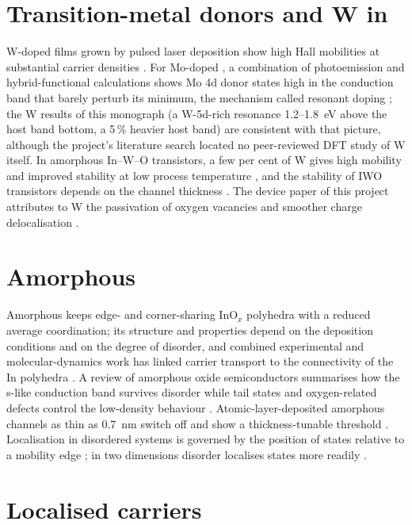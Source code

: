 \section{Transition-metal donors and W in \texorpdfstring{\InO}{In2O3}}
\label{sec:mono-lit-w}

W-doped \InO{} films grown by pulsed laser deposition show high Hall mobilities at substantial carrier densities
\citep{Newhouse2005}. For Mo-doped \InO{}, a combination of photoemission and hybrid-functional calculations shows Mo 4d
donor states high in the conduction band that barely perturb its minimum, the mechanism called resonant doping
\citep{Swallow2020}; the W results of this monograph (a W-5d-rich resonance 1.2--1.8~eV above the host band bottom, a
5\,\% heavier host band) are consistent with that picture, although the project's literature search located no
peer-reviewed DFT study of W itself. In amorphous In--W--O transistors, a few per cent of W gives high mobility and
improved stability at low process temperature \citep{Kizu2014}, and the stability of IWO transistors depends on the
channel thickness \citep{Kim2024}. The device paper of this project attributes to W the passivation of oxygen vacancies
and smoother charge delocalisation \citep[p.~4]{Januar2026}.

\section{Amorphous \texorpdfstring{\InO}{In2O3}}
\label{sec:mono-lit-amorph}

Amorphous \InO{} keeps edge- and corner-sharing InO$_x$ polyhedra with a reduced average coordination; its structure and
properties depend on the deposition conditions and on the degree of disorder, and combined experimental and
molecular-dynamics work has linked carrier transport to the connectivity of the In polyhedra \citep{Buchholz2014}. A
review of amorphous oxide semiconductors summarises how the s-like conduction band survives disorder while tail states
and oxygen-related defects control the low-density behaviour \citep{Medvedeva2017}. Atomic-layer-deposited amorphous
\InO{} channels as thin as 0.7~nm switch off and show a thickness-tunable threshold \citep[p.~500]{Si2021}. Localisation
in disordered systems is governed by the position of states relative to a mobility edge \citep{Mott1969,Anderson1958};
in two dimensions disorder localises states more readily \citep{Abrahams1979}.

\section{Localised carriers}
\label{sec:mono-lit-polaron}

